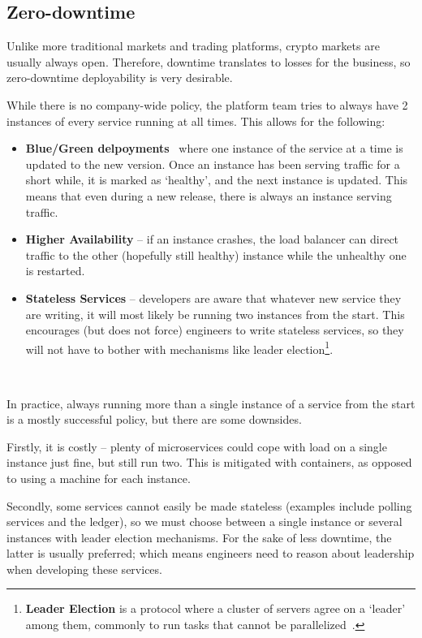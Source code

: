 \documentclass[conference]{IEEEtran}
\begin{document}
    \subsection{Zero-downtime}

    Unlike more traditional markets and trading platforms, crypto markets are usually always open.
    Therefore, downtime translates to losses for the business, so zero-downtime deployability is
    very desirable.

    While there is no company-wide policy, the platform team tries to always have 2 instances
    of every service running at all times.
    This allows for the following:

    \begin{itemize}
        \newcommand{\entry}[1]{\item[] \hspace{-1em}\textbf{#1}}
        \entry{Blue/Green delpoyments}~\cite{nomadBlueGreen} where one instance of the
        service at a time is updated to the new version.
        Once an instance has been serving traffic for a short while, it is marked as `healthy', and
        the next instance is updated.
        This means that even during a new release, there is always an instance serving traffic.
        \entry{Higher Availability} -- if an instance crashes, the load balancer can direct traffic
        to the other (hopefully still healthy) instance while the unhealthy one is restarted.
        \entry{Stateless Services} -- developers are aware that whatever new service they are
        writing, it will most likely be running two instances from the start.
        This encourages (but does not force) engineers to write stateless services, so they will not
        have to bother with mechanisms like leader election\footnote{
            \textbf{Leader Election} is a protocol where a cluster of servers agree on a
            `leader' among them, commonly to run tasks that cannot be parallelized~\cite{attiya2004distributed}.}.
    \end{itemize}\

    In practice, always running more than a single instance of a service from the start is a mostly
    successful policy, but there are some downsides.

    Firstly, it is costly -- plenty of microservices could cope with load on a single instance just
    fine, but still run two.
    This is mitigated with containers, as opposed to using a machine for each
    instance.

    Secondly, some services cannot easily be made stateless (examples include polling services
    and the ledger), so we must choose between a single instance or several instances with leader
    election mechanisms.
    For the sake of less downtime, the latter is usually preferred;
    which means engineers need to reason about leadership when developing these services.
\end{document}
